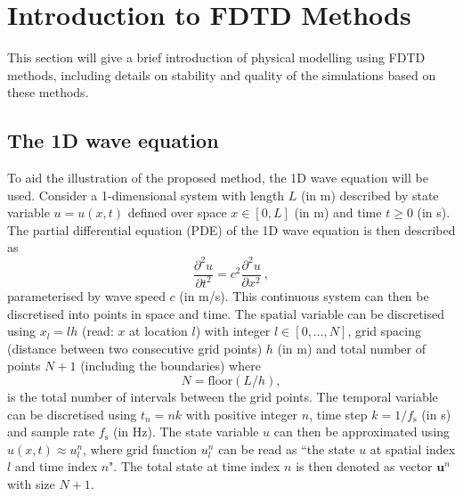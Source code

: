 \documentclass[dvipsnames, reprint]{JASA}
\begin{document}
\section{\label{sec:FDTD} Introduction to FDTD Methods}
This section will give a brief introduction of physical modelling using FDTD methods, including details on stability and quality of the simulations based on these methods.


\subsection{The 1D wave equation}
To aid the illustration of the proposed method, the 1D wave equation will be used. 
Consider a 1-dimensional system with length $L$ (in m) described by state variable $u = u(x, t)$ defined over space $x \in [0, L]$ (in m) and time $t \geq 0$ (in s). The partial differential equation (PDE) of the 1D wave equation is then described as
\begin{equation}\label{eq:1dwave}
    \frac{\partial^2 u}{\partial t^2}= c^2\frac{\partial^2 u}{\partial x^2}\ ,
\end{equation}
parameterised by wave speed $c$ (in m/s).
This continuous system can then be discretised into points in space and time. The spatial variable can be discretised using $x_l = lh$ (read: $x$ at location $l$) with integer $l \in [0, \hdots, N]$, grid spacing (distance between two consecutive grid points) $h$ (in m) and total number of points $N + 1$ (including the boundaries) where
\begin{equation}\label{eq:numberOfPoints}
    N = \text{floor}(L/h),
\end{equation}
is the total number of intervals between the grid points. The temporal variable can be discretised using $t_n = nk$ with positive integer $n$, time step $k = 1/f_\text{s}$ (in s) and sample rate $f_\text{s}$ (in Hz). The state variable $u$ can then be approximated using $u(x,t) \approx u_l^n$, where grid function $u_l^n$ can be read as ``the state $u$ at spatial index $l$ and time index $n$". The total state at time index $n$ is then denoted as vector $\mathbf{u}^n$ with size $N+1$.
\end{document}

